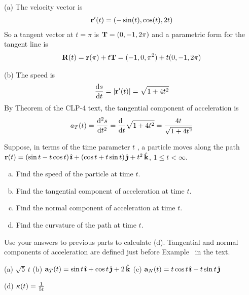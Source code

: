 \begin{solution} (a)
The velocity vector is
\begin{align*}
\mathbf{r}'(t) = (-\sin(t), \cos(t), 2t)
\end{align*}
So a tangent vector at $t=\pi$ is $\mathbf{T}= (0,-1,2\pi)$ and a 
parametric form for the tangent line is
\begin{align*}
\mathbf{R}(t) =\mathbf{r}(\pi) +t\mathbf{T} = (-1,0,\pi^2)+t(0,-1,2\pi)
\end{align*}

\noindent (b)
The speed is
\begin{align*}
\diff{s}{t} = |\vr'(t)| = \sqrt{1+4t^2}
\end{align*}
By Theorem  of the CLP-4 text,
the tangential component of acceleration is
\begin{align*}
a_T(t) = \difftwo{s}{t}
       =\diff{\hfill}{t}\sqrt{1+4t^2}
       =\frac{4t}{\sqrt{1+4t^2}}
\end{align*}
\end{solution}

\begin{question}[M317 2010A]  %
Suppose, in terms of the time parameter $t$ , a particle moves along the path
$\mathbf{r}(t) = (\sin t - t \cos t )\,\hat{\pmb{\imath}} + (\cos t + t \sin t )\,\hat{\pmb{\jmath}} + t^2\,\hat{\mathbf{k}}$, 
$1 \le t < \infty$.
\begin{enumerate}[(a)]
\item
Find the speed of the particle at time $t$.
\item
Find the tangential component of acceleration at time $t$.
\item
Find the normal component of acceleration at time $t$.
\item
Find the curvature of the path at time $t$.
\end{enumerate}
\end{question}

\begin{hint} 
Use your answers to previous parts to calculate (d). Tangential and normal components of acceleration are defined just before Example~ in the text.
\end{hint}

\begin{answer} 
(a) $\sqrt{5}\,t$\qquad
(b) $\mathbf{a}_T(t) =  \sin t \,\hat{\pmb{\imath}}   + \cos t \,\hat{\pmb{\jmath}}   + 2\,\hat{\mathbf{k}}$\qquad
(c) $\mathbf{a}_N(t) =  t\cos t \,\hat{\pmb{\imath}}   - t\sin t \,\hat{\pmb{\jmath}}$ \qquad  

(d) $\kappa(t) = \frac{1}{5t}$

\end{answer}

